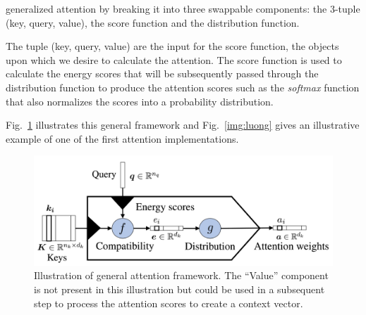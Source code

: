 \citet{atencao_review} generalized attention by breaking it into three swappable components: the 3-tuple (key, query, value), the score function and the distribution function. 


The tuple (key, query, value) are the input for the score function, the objects upon which we desire to calculate the attention. The score function is used to calculate the energy scores that will be subsequently passed through the distribution function to produce the attention scores such as the \textit{softmax} function that also normalizes the scores into a probability distribution.

Fig.~\ref{fig:atencao_geral} illustrates this general framework and Fig.~\ref{img:luong} gives an illustrative example of one of the first attention implementations.

  
\begin{figure}[!ht]
\centering
\includegraphics[width=0.8\linewidth]{figuras/atencao_geral.png}
\caption{Illustration of \citet{atencao_review} general attention framework. The ``Value'' component is not present in this illustration but could be used in a subsequent step to process the attention scores to create a context vector. }
\label{fig:atencao_geral}
\end{figure}


